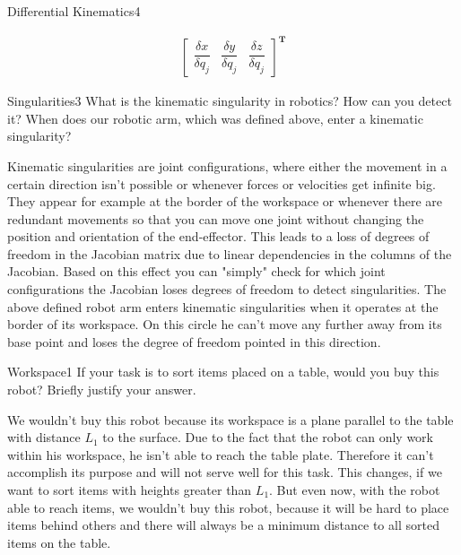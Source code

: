 \begin{questions}
\begin{question}{Differential Kinematics}{4}
\begin{answer}
\begin{align*}
	\begin{bmatrix}
	\dfrac{\delta x }{ \delta q_j} & \dfrac{\delta y}{ \delta q_j} & \dfrac{\delta z}{\delta q_j}
	\end{bmatrix}^\textbf{T}
\end{align*}



\end{answer}

\end{question}


\begin{question}{Singularities}{3}
What is the kinematic singularity in robotics? How can you detect it? When does our robotic arm, which was defined above, enter a kinematic singularity?

\begin{answer}
	Kinematic singularities are joint configurations, where either the movement in a certain direction isn't possible or whenever forces or velocities get infinite big. They appear for example at the border of the workspace or whenever there are redundant movements so that you can move one joint without changing the position and orientation of the end-effector. This leads to a loss of degrees of freedom in the Jacobian matrix due to linear dependencies in the columns of the Jacobian. Based on this effect you can "simply" check for which joint configurations the Jacobian loses degrees of freedom to detect singularities.
	The above defined robot arm enters kinematic singularities when it operates at the border of its workspace. On this circle he can't move any further away from its base point and loses the degree of freedom pointed in this direction.
\end{answer}

\end{question}


\begin{question}{Workspace}{1}
If your task is to sort items placed on a table, would you buy this robot? Briefly justify your answer.

\begin{answer}
We wouldn't buy this robot because its workspace is a plane parallel to the table with distance $L_1$ to the surface. Due to the fact that the robot can only work within his workspace, he isn't able to reach the table plate. Therefore it can't accomplish its purpose and will not serve well for this task. This changes, if we want to sort items with heights greater than $L_1$. But even now, with the robot able to reach items, we wouldn't buy this robot, because it will be hard to place items behind others and there will always be a minimum distance to all sorted items on the table.
\end{answer}
\end{question}

\end{questions}
